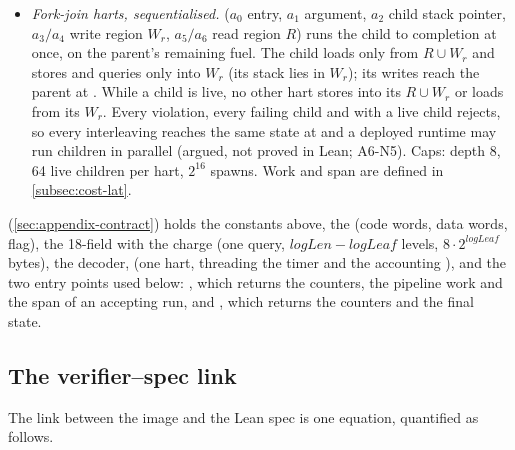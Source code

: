 \begin{itemize}[nosep]
  (the 18 counters of \cref{subsec:cost-vector}, with first-touch sets of doublewords and 1\,KiB
  pages, code and data keyed apart, a written page counted twice) and the scoreboard timer
   next to the machine state. No branch of the decision reads them, except the spawn
  counter that issues handles and enforces the $2^{16}$ cap. For an image without harts the
  decision and final state are v0.2's word for word and the counters coarsen to v0.2's
  (), so v0.2  proofs transfer;  gives a
  timer-free single-hart machine equal to , so cost proofs never mention the timer.
\item \emph{Fork-join harts, sequentialised.}  ($a_0$ entry, $a_1$ argument, $a_2$
  child stack pointer, $a_3/a_4$ write region $W_r$, $a_5/a_6$ read region $R$) runs the child to
  completion at once, on the parent's remaining fuel. The child loads only from $R\cup W_r$ and
  stores and queries only into $W_r$ (its stack lies in $W_r$); its writes reach the parent at
  . While a child is live, no other hart stores into its $R\cup W_r$ or loads from its
  $W_r$. Every violation, every failing child and  with a live child rejects, so every
  interleaving reaches the same state at  and a deployed runtime may run children in
  parallel (argued, not proved in Lean; A6-N5). Caps: depth 8, 64 live children per hart, $2^{16}$ spawns. Work and span are defined in
  \cref{subsec:cost-lat}.
\end{itemize}

\noindent {} (\cref{sec:appendix-contract}) holds the constants above, the
 (code words, data words,  flag), the 18-field  with the
 charge  (one query, $\mathit{logLen}-\mathit{logLeaf}$ levels,
$8\cdot2^{\mathit{logLeaf}}$ bytes), the decoder,  (one hart, threading the timer
 and the accounting ), and the two entry points used below: ,
which returns the counters, the pipeline work and the span of an accepting run, and ,
which returns the counters and the final state.

\subsection{The verifier--spec link}\label{subsec:proto-agrees}

The link between the image and the Lean spec is one equation, quantified as follows.


